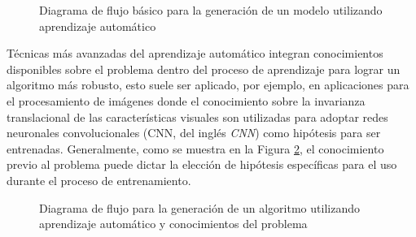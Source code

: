 \documentclass[10pt,a4paper]{article}
\begin{document}
\begin{figure}[h!]
    \begin{center}
    \end{center}
    \caption{Diagrama de flujo b\'asico para la generaci\'on de un modelo
    utilizando aprendizaje autom\'atico}
    \label{ml_approach}
\end{figure}

T\'ecnicas m\'as avanzadas del aprendizaje autom\'atico integran conocimientos
disponibles sobre el problema dentro del proceso de aprendizaje para lograr un
algoritmo m\'as robusto, esto suele ser aplicado, por ejemplo, en aplicaciones
para el procesamiento de im\'agenes donde el conocimiento sobre la invarianza
translacional de las caracter\'isticas visuales son utilizadas para adoptar
redes neuronales convolucionales (\acrshort{CNN}, del ingl\'es 
\emph{\acrlong{CNN}}) como hip\'otesis para ser entrenadas. Generalmente, como
se muestra en la Figura \ref{ml_ext_approach}, el conocimiento previo al
problema puede dictar la elecci\'on de hip\'otesis espec\'ificas para el uso
durante el proceso de entrenamiento. 

\newpage

\begin{figure}[h!]
    \begin{center}
    \end{center}
    \caption{Diagrama de flujo para la generaci\'on de un algoritmo 
    utilizando aprendizaje autom\'atico y conocimientos del problema}
    \label{ml_ext_approach}
\end{figure}
\end{document}
